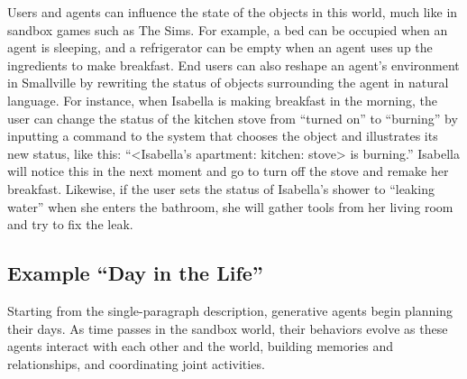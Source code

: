 Users and agents can influence the state of the objects in this world, much like in sandbox games such as The Sims. For example, a bed can be occupied when an agent is sleeping, and a refrigerator can be empty when an agent uses up the ingredients to make breakfast. End users can also reshape an agent's environment in Smallville by rewriting the status of objects surrounding the agent in natural language. For instance, when Isabella is making breakfast in the morning, the user can change the status of the kitchen stove from “turned on” to “burning” by inputting a command to the system that chooses the object and illustrates its new status, like this: ``<Isabella's apartment: kitchen: stove> is burning.'' Isabella will notice this in the next moment and go to turn off the stove and remake her breakfast. Likewise, if the user sets the status of Isabella's shower to “leaking water” when she enters the bathroom, she will gather tools from her living room and try to fix the leak. 




\subsection{Example ``Day in the Life''}
Starting from the single-paragraph description, generative agents begin planning their days. As time passes in the sandbox world, their behaviors evolve as these agents interact with each other and the world, building memories and relationships, and coordinating joint activities.

